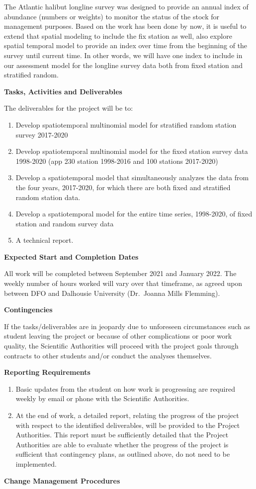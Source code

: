 \documentclass[12pt]{article}\usepackage[]{graphicx}\usepackage[]{color}
\begin{document}
\begin{appendices}
The Atlantic halibut longline survey was designed to provide an annual index of abundance (numbers or weights) to monitor the status of the stock for management purposes. Based on the work has been done by now, it is useful to extend that spatial modeling to include the fix station as well, also explore spatial temporal model to provide an index over time from the beginning of the survey until current time. In other words, we will have one index to include in our assessment model for the longline survey data both from fixed station and stratified random.

\textbf{Tasks, Activities and Deliverables}

The deliverables for the project will be to:
\begin{enumerate}
\def\labelenumi{\arabic{enumi})}
\item
  Develop spatiotemporal multinomial model for stratified random station survey 2017-2020
\item
  Develop spatiotemporal multinomial model for the fixed station survey data 1998-2020 (app 230 station 1998-2016 and 100 stations 2017-2020)
\item
  Develop a spatiotemporal model that simultaneously analyzes the data from the four years, 2017-2020, for which there are both fixed and stratified random station data.
\item
  Develop a spatiotemporal model for the entire time series, 1998-2020, of fixed station and random survey data
\item
  A technical report.
\end{enumerate}
\textbf{Expected Start and Completion Dates}

All work will be completed between September 2021 and January 2022. The weekly number of hours worked will vary over that timeframe, as agreed upon between DFO and Dalhousie University (Dr.~Joanna Mills Flemming).

\textbf{Contingencies}

If the tasks/deliverables are in jeopardy due to unforeseen circumstances such as student leaving the project or because of other complications or poor work quality, the Scientific Authorities will proceed with the project goals through contracts to other students and/or conduct the analyses themselves.

\textbf{Reporting Requirements}
\begin{enumerate}
\def\labelenumi{\arabic{enumi}.}
\item
  Basic updates from the student on how work is progressing are required weekly by email or phone with the Scientific Authorities.
\item
  At the end of work, a detailed report, relating the progress of the project with respect to the identified deliverables, will be provided to the Project Authorities. This report must be sufficiently detailed that the Project Authorities are able to evaluate whether the progress of the project is sufficient that contingency plans, as outlined above, do not need to be implemented.
\end{enumerate}
\textbf{Change Management Procedures}


\end{appendices}
\end{document}
